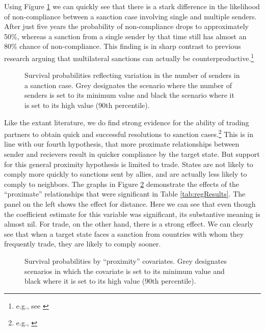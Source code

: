 Using Figure \ref{fig:surv1} we can quickly see that there is a stark difference in the likelihood of non-compliance between a sanction case involving single and multiple senders. After just five years the probability of non-compliance drops to approximately 50\%, whereas a sanction from a single sender by that time still has almost an 80\% chance of non-compliance. This finding is in sharp contrast to previous research arguing that multilateral sanctions can actually be counterproductive.\footnote{e.g., see \citealp{drezner2000bargaining}}

\begin{figure}[ht]
	\centering
	\caption{Survival probabilities reflecting variation in the number of senders in a sanction case. Grey designates the scenario where the number of senders is set to its minimum value and black the scenario where it is set to its high value (90th percentile).}
	\resizebox{0.7\textwidth}{!}{}
	\label{fig:surv1}
\end{figure}

Like the extant literature, we do find strong evidence for the ability of trading partners to obtain quick and successful resolutions to sanction cases.\footnote{e.g., \citealp{mclean2010friends}} This is in line with our fourth hypothesis, that more proximate relationships between sender and recievers result in quicker compliance by the target state. But support for this general proximity hypothesis is limited to trade. States are not likely to comply more quickly to sanctions sent by allies, and are actually less likely to comply to neighbors. The graphs in Figure \ref{fig:surv2} demonstrate the effects of the ``proximate'' relationships that were significant in Table \ref{tab:regResults}. The panel on the left shows the effect for distance. Here we can see that even though the coefficient estimate for this variable was significant, its substantive meaning is almost nil. For trade, on the other hand, there is a strong effect. We can clearly see that when a target state faces a sanction from countries with whom they frequently trade, they are likely to comply sooner.


\begin{figure}[ht]
	\centering
	\caption{Survival probabilities by ``proximity'' covariates. Grey designates scenarios in which the covariate is set to its minimum value and black where it is set to its high value (90th percentile).}
	\resizebox{1\textwidth}{!}{}	
	\label{fig:surv2}
\end{figure}


